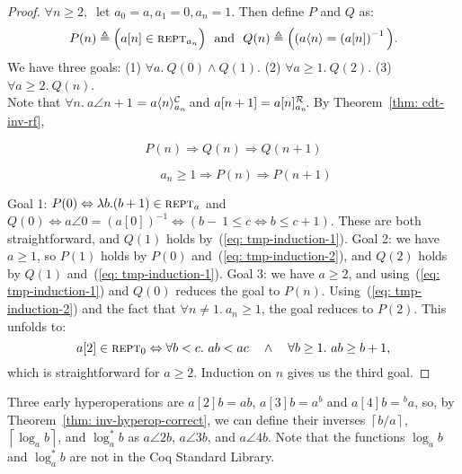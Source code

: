 \begin{proof}
$\forall n \ge 2,~$ let $a_0 = a, a_1 = 0, a_n = 1$. Then define $P$ and $Q$ as:
\begin{equation*}
P(n) \triangleq  \Big(a[n] \in \text{\scshape{rept}}_{a_n}\Big)\ \text{ and } \
Q(n) \triangleq  \Big((a\langle n\rangle = \left(a[n]\right)^{-1} \Big).
\end{equation*}
We have three goals:
(1) $\forall a.~ Q(0) \wedge Q(1)$.
(2) $\forall a \ge 1.~ Q(2)$.
(3) $\forall a \ge 2.~ Q(n)$. \\
Note that \mbox{$\forall n.~ a\angle{n+1}$} $= \cdt{a\angle{n}}{a_n}$ and $a[n+1] = \rf{a[n]}{a_n}$. By Theorem~\ref{thm: cdt-inv-rf},

\vspace*{-1em}
\noindent\begin{minipage}{.45\linewidth}
\begin{equation}
P(n) \Rightarrow Q(n) \Rightarrow Q(n+1) \label{eq: tmp-induction-1}
\end{equation}
\end{minipage}
\begin{minipage}{.55\linewidth}
\begin{equation}
\qquad a_{n} \ge 1 \Rightarrow P(n) \Rightarrow P(n+1) \label{eq: tmp-induction-2}
\end{equation}
\end{minipage}
Goal 1: $P(0) \Leftrightarrow \lambda b.(b+1)\in \text{\scshape{rept}}_a$ and
$Q(0) \iff a\angle{0} = \left(a[0]\right)^{-1} \iff (b-~1\le c \iff b\le c+1)$.
These are both straightforward, and $Q(1)$ holds by~(\ref{eq: tmp-induction-1}). Goal 2: we have $a \ge 1$, so
$P(1)$ holds by $P(0)$ and~(\ref{eq: tmp-induction-2}), and
$Q(2)$ holds by $Q(1)$ and~(\ref{eq: tmp-induction-1}).
Goal 3: we have $a\ge 2$, and using~(\ref{eq: tmp-induction-1}) and $Q(0)$
reduces the goal to $P(n)$. Using~(\ref{eq: tmp-induction-2}) and the fact that $\forall n \neq 1.~a_n\ge 1$, the goal reduces to $P(2)$. This unfolds to:
\begin{equation*}
a[2]\in \text{\scshape{rept}}_0 \Leftrightarrow \forall b < c.~ab < ac \quad \wedge \quad \forall b \ge 1.~ab \ge b+1\text{,}
\end{equation*}
which is straightforward for $a\ge 2$. Induction on $n$ gives us the third goal.
\end{proof}
\begin{rem}
Three early hyperoperations are $a[2]b = ab$, $a[3]b = a^b$ and \linebreak $a[4]b = \! ^ba$, so, by Theorem~\ref{thm: inv-hyperop-correct}, we can define their inverses $\left\lceil b/a \right\rceil$, $\left\lceil \log_a b \right\rceil$, and $\log^*_a b$ as $a\angle{2}b$, $a\angle{3}b$, and $a\angle{4}b$.
Note that the functions $\log_a b$ and $\log^*_a b$ are not in the Coq Standard Library.
\end{rem}
